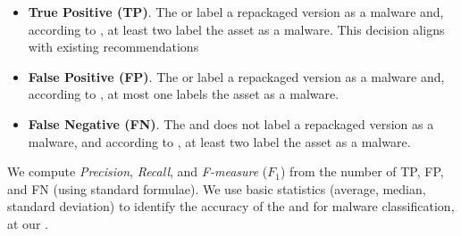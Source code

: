 \begin{itemize}
\item {\bf True Positive (TP)}. The \mas or \ml label a repackaged version as a malware and, according to
  \vt, at least two \ses label the asset as a malware. This decision aligns with existing recommendations~\cite{vt-label,DBLP:journals/ese/KhanmohammadiEH19}
   
\item {\bf False Positive (FP)}. The \mas or \ml label a repackaged version as a malware and, according to \vt, at most one \se labels the asset as a malware.

\item {\bf False Negative (FN)}. The \mas and \ml does not label a repackaged version as a malware, and according to \vt, at least two \ses label the asset as a malware.
\end{itemize}

We compute \emph{Precision}, \emph{Recall}, and \emph{F-measure} ($F_1$) from
the number of TP, FP, and FN (using standard
formulae). We use basic statistics (average, median, standard deviation) to identify the
accuracy of the \mas and \ml for malware classification, at our \cds.